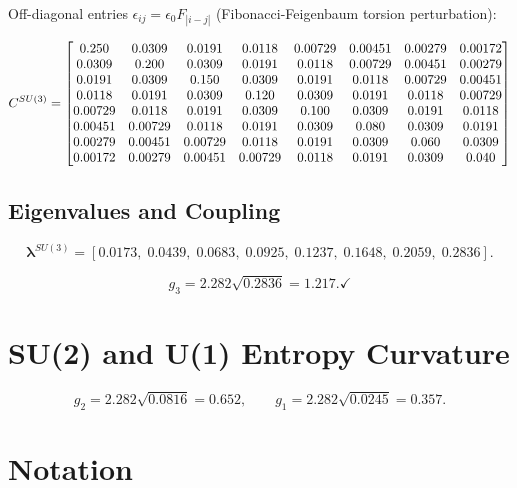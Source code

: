 \documentclass[11pt]{article}
\begin{document}
Off-diagonal entries $\epsilon_{ij}=\epsilon_0 F_{|i-j|}$
(Fibonacci-Feigenbaum torsion perturbation):

\begin{equation}
C^{SU(3)} =
\resizebox{\textwidth}{!}{$
\begin{bmatrix}
0.250 & 0.0309 & 0.0191 & 0.0118 & 0.00729 & 0.00451 & 0.00279 & 0.00172 \\
0.0309 & 0.200 & 0.0309 & 0.0191 & 0.0118 & 0.00729 & 0.00451 & 0.00279 \\
0.0191 & 0.0309 & 0.150 & 0.0309 & 0.0191 & 0.0118 & 0.00729 & 0.00451 \\
0.0118 & 0.0191 & 0.0309 & 0.120 & 0.0309 & 0.0191 & 0.0118 & 0.00729 \\
0.00729 & 0.0118 & 0.0191 & 0.0309 & 0.100 & 0.0309 & 0.0191 & 0.0118 \\
0.00451 & 0.00729 & 0.0118 & 0.0191 & 0.0309 & 0.080 & 0.0309 & 0.0191 \\
0.00279 & 0.00451 & 0.00729 & 0.0118 & 0.0191 & 0.0309 & 0.060 & 0.0309 \\
0.00172 & 0.00279 & 0.00451 & 0.00729 & 0.0118 & 0.0191 & 0.0309 & 0.040
\end{bmatrix}
$}
\end{equation}

\subsection{Eigenvalues and Coupling}

\begin{equation}
  \boldsymbol{\lambda}^{SU(3)}
  = [0.0173,\;0.0439,\;0.0683,\;0.0925,\;
     0.1237,\;0.1648,\;0.2059,\;0.2836].
\end{equation}

\begin{equation}
  g_3 = 2.282\sqrt{0.2836} = 1.217. \checkmark
\end{equation}

\section{SU(2) and U(1) Entropy Curvature}
\label{app:su2u1}

\begin{equation}
  g_2 = 2.282\sqrt{0.0816} = 0.652,
  \qquad
  g_1 = 2.282\sqrt{0.0245} = 0.357.
\end{equation}

\section{Notation}
\label{app:notation}
\end{document}
